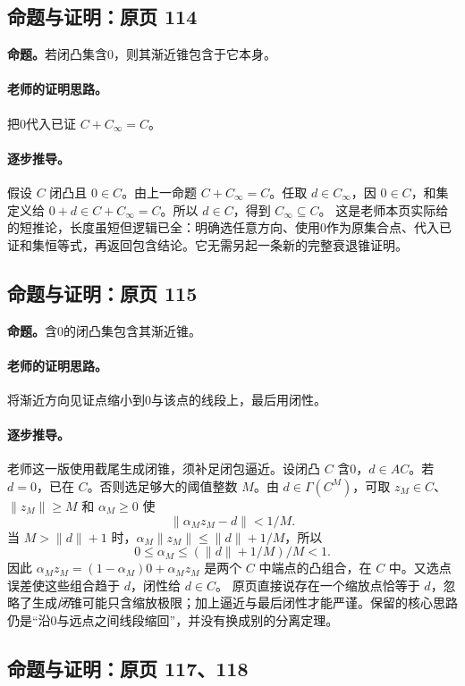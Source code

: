 \documentclass[11pt,a4paper]{article}
\theoremstyle{definition}\newtheorem{definition}{定义}\newtheorem{example}{例}
\begin{document}
\subsection{命题与证明：原页 114}

\textbf{命题。}若闭凸集含0，则其渐近锥包含于它本身。

\paragraph{老师的证明思路。}把0代入已证 $C+C_\infty=C$。

\paragraph{逐步推导。}
假设 $C$ 闭凸且 $0\in C$。由上一命题 $C+C_\infty=C$。任取 $d\in C_\infty$，因 $0\in C$，和集定义给 $0+d\in C+C_\infty=C$。所以 $d\in C$，得到 $C_\infty\subseteq C$。
这是老师本页实际给的短推论，长度虽短但逻辑已全：明确选任意方向、使用0作为原集合点、代入已证和集恒等式，再返回包含结论。它无需另起一条新的完整衰退锥证明。


\subsection{命题与证明：原页 115}

\textbf{命题。}含0的闭凸集包含其渐近锥。

\paragraph{老师的证明思路。}将渐近方向见证点缩小到0与该点的线段上，最后用闭性。

\paragraph{逐步推导。}
老师这一版使用截尾生成闭锥，须补足闭包逼近。设闭凸 $C$ 含0，$d\in AC$。若 $d=0$，已在 $C$。否则选足够大的阈值整数 $M$。由 $d\in\Gamma(C^M)$，可取 $z_M\in C$、$\|z_M\|\ge M$ 和 $\alpha_M\ge0$ 使
\[\|\alpha_Mz_M-d\|<1/M.\]
当 $M>\|d\|+1$ 时，$\alpha_M\|z_M\|\le\|d\|+1/M$，所以
\[0\le\alpha_M\le(\|d\|+1/M)/M<1.\]
因此 $\alpha_Mz_M=(1-\alpha_M)0+\alpha_Mz_M$ 是两个 $C$ 中端点的凸组合，在 $C$ 中。又选点误差使这些组合趋于 $d$，闭性给 $d\in C$。
原页直接说存在一个缩放点恰等于 $d$，忽略了生成\emph{闭}锥可能只含缩放极限；加上逼近与最后闭性才能严谨。保留的核心思路仍是“沿0与远点之间线段缩回”，并没有换成别的分离定理。


\subsection{命题与证明：原页 117、118}
\end{document}

